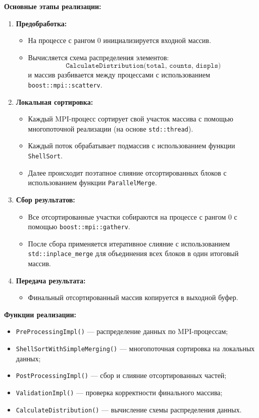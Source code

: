 \documentclass[12pt]{article}
\begin{document}
\textbf{Основные этапы реализации:}
\begin{enumerate}
  \item \textbf{Предобработка:}
  \begin{itemize}
    \item На процессе с рангом 0 инициализируется входной массив.
    \item Вычисляется схема распределения элементов: 
    \[
    \texttt{CalculateDistribution(total, counts, displs)}
    \]
    и массив разбивается между процессами с использованием \texttt{boost::mpi::scatterv}.
  \end{itemize}

  \item \textbf{Локальная сортировка:}
  \begin{itemize}
    \item Каждый MPI-процесс сортирует свой участок массива с помощью многопоточной реализации (на основе \texttt{std::thread}).
    \item Каждый поток обрабатывает подмассив с использованием функции \texttt{ShellSort}.
    \item Далее происходит поэтапное слияние отсортированных блоков с использованием функции \texttt{ParallelMerge}.
  \end{itemize}

  \item \textbf{Сбор результатов:}
  \begin{itemize}
    \item Все отсортированные участки собираются на процессе с рангом 0 с помощью \texttt{boost::mpi::gatherv}.
    \item После сбора применяется итеративное слияние с использованием \texttt{std::inplace\_merge} для объединения всех блоков в один итоговый массив.
  \end{itemize}

  \item \textbf{Передача результата:}
  \begin{itemize}
    \item Финальный отсортированный массив копируется в выходной буфер.
  \end{itemize}
\end{enumerate}

\textbf{Функции реализации:}
\begin{itemize}
  \item \texttt{PreProcessingImpl()} — распределение данных по MPI-процессам;
  \item \texttt{ShellSortWithSimpleMerging()} — многопоточная сортировка на локальных данных;
  \item \texttt{PostProcessingImpl()} — сбор и слияние отсортированных частей;
  \item \texttt{ValidationImpl()} — проверка корректности финального массива;
  \item \texttt{CalculateDistribution()} — вычисление схемы распределения данных.
\end{itemize}
\end{document}

